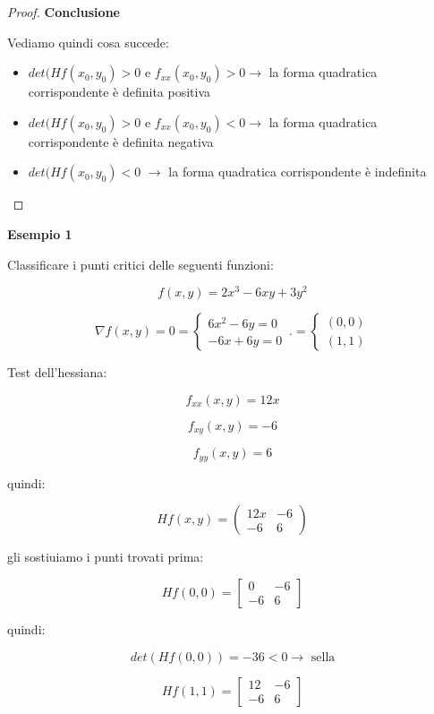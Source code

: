 \documentclass[../appunti-analisi.tex]{subfiles}
\begin{document}
\begin{proof}
\textbf{Conclusione} 

Vediamo quindi cosa succede:

\begin{itemize}
    \item $det(Hf(x_0,y_0)>0$ e $f_{xx}(x_0,y_0)>0 \rightarrow $ la forma quadratica corrispondente è definita positiva
    \item $det(Hf(x_0,y_0)>0$ e $f_{xx}(x_0,y_0)<0 \rightarrow $ la forma quadratica corrispondente è definita negativa
    \item $det(Hf(x_0,y_0)<0$ $\rightarrow $ la forma quadratica corrispondente è indefinita
\end{itemize}

\end{proof}
 
\textbf{Esempio 1} 

Classificare i punti critici delle seguenti funzioni:

\[
    f(x,y) = 2x^{3}-6xy + 3y^{2}
\]

\[
    \nabla f(x,y)=0 = \begin{cases}
               6x^{2}-6y=0\\
               -6x + 6y =0
        \end{cases}\,. = \begin{cases}
        (0,0)\\
        (1,1)
        \end{cases}
\]

Test dell'hessiana:

\[
    f_{xx}(x,y) = 12x
\]

\[
    f_{xy}(x,y)= -6
\]

\[
    f_{yy}(x,y) = 6
\]

quindi:

\[
    H f(x,y) = \begin{pmatrix}
    12x & -6\\
    -6 & 6 
    \end{pmatrix}
\]

gli sostiuiamo i punti trovati prima:

\[
    Hf(0,0) = \begin{bmatrix}
    0 & -6\\
    -6 & 6
    \end{bmatrix}
\]

quindi:

\[
    det (Hf(0,0)) = -36 <0 \rightarrow \text{ sella}
\]

\[
    Hf(1,1) = \begin{bmatrix}
    12 & -6\\
    -6 & 6
    \end{bmatrix}
\]
\end{document}
